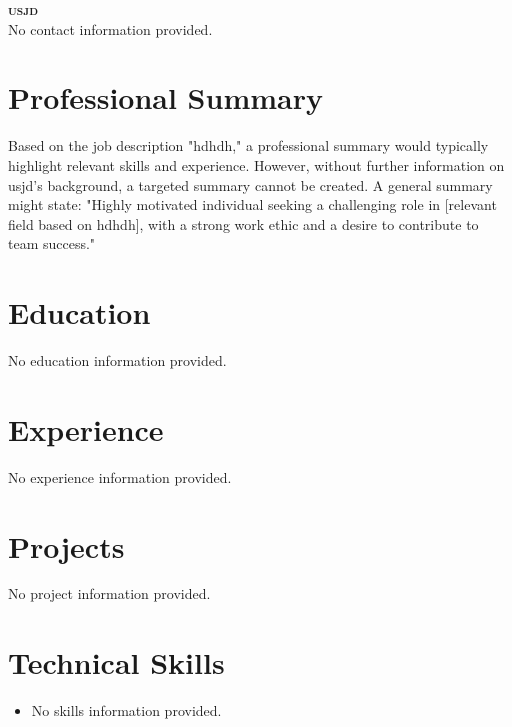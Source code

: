 \documentclass[letterpaper,11pt]{article}
\newcommand{\resumeSubHeadingListStart}{\begin{itemize}[leftmargin=0.15in, label={}]}
\newcommand{\resumeSubHeadingListEnd}{\end{itemize}}
\begin{document}
\begin{center}
\textbf{\Huge \scshape usjd} \\ \vspace{1pt}
\small No contact information provided.
\end{center}


\section{Professional Summary} %
Based on the job description "hdhdh," a professional summary would typically highlight relevant skills and experience. However, without further information on usjd's background, a targeted summary cannot be created. A general summary might state: "Highly motivated individual seeking a challenging role in [relevant field based on hdhdh], with a strong work ethic and a desire to contribute to team success."

\section{Education}
\resumeSubHeadingListStart
No education information provided.
\resumeSubHeadingListEnd

\section{Experience}
\resumeSubHeadingListStart
No experience information provided.
\resumeSubHeadingListEnd

\section{Projects}
\resumeSubHeadingListStart
No project information provided.
\resumeSubHeadingListEnd

\section{Technical Skills} %
\begin{itemize}[leftmargin=0.15in, label={}]
\item{
No skills information provided.
} \\
\end{itemize}


\end{document}
